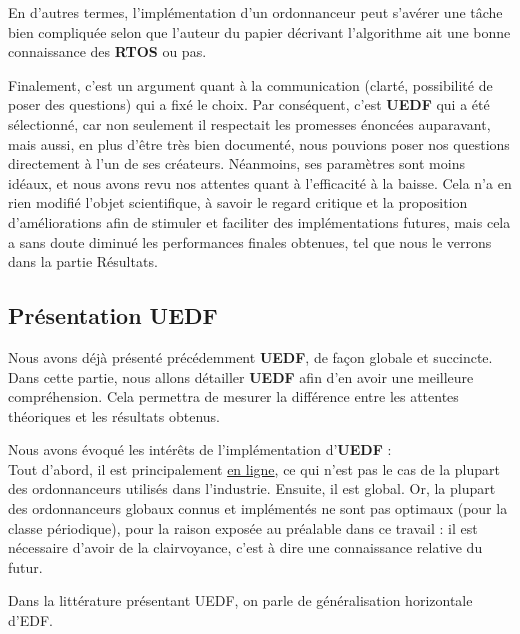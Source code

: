 	En d'autres termes, l'implémentation d'un ordonnanceur peut s'avérer une tâche bien compliquée selon que l'auteur du papier décrivant l'algorithme 
	ait une bonne connaissance des \textbf{RTOS} ou pas. 
	\newline

	
	Finalement, c'est un argument quant à la communication (clarté, possibilité de poser des questions) 
	qui a fixé le choix. Par conséquent, c'est \textbf{UEDF} qui a été sélectionné, car 
	non seulement il respectait 
	les promesses énoncées auparavant, mais aussi, en plus d'être très bien documenté, 
	nous pouvions poser nos questions directement à l'un de ses créateurs. Néanmoins, ses paramètres sont moins idéaux, 
	et nous avons revu nos attentes quant à l'efficacité à la baisse. Cela n'a en rien 
	modifié l'objet scientifique, à savoir le regard critique et la proposition d'améliorations 
	afin de stimuler et faciliter des implémentations futures, mais cela a sans doute 
	diminué les performances finales obtenues, tel que nous le verrons dans la partie Résultats.\newline
	
	
	\subsection{Présentation UEDF}
	
	Nous avons déjà présenté précédemment \textbf{UEDF}, de façon globale et succincte. 
	Dans cette partie, nous allons détailler \textbf{UEDF} afin d'en avoir une meilleure compréhension. Cela 
	permettra de mesurer la différence entre les attentes théoriques et les résultats obtenus.\newline

	Nous avons évoqué les intérêts de l'implémentation d'\textbf{UEDF} :\\
	Tout d'abord, il est principalement \hyperref[inline]{en ligne}, ce qui n'est pas le cas de 
	la plupart des ordonnanceurs utilisés dans l'industrie.
	Ensuite, il est global. Or, la plupart des ordonnanceurs 
	globaux connus et implémentés ne sont pas optimaux (pour la classe périodique), pour la
	raison exposée au préalable dans ce travail : il est nécessaire d'avoir de la clairvoyance, 
	c'est à dire une connaissance relative du futur.\newline
	
	Dans la littérature présentant UEDF, on parle de généralisation horizontale d'EDF. 
	
	
	
